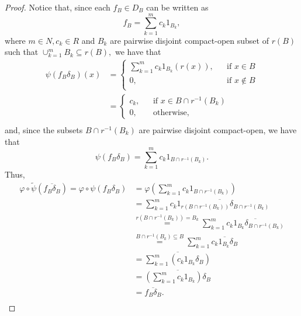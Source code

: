 \documentclass[11pt, a4paper]{amsart}
\theoremstyle{plain}
\begin{document}
\begin{proof}
Notice that, since each $f_B  \in D_B$ can be written as
  $$f_B= \sum_{k=1}^m c_k 1_{B_k},$$
where $m \in N, c_k \in R$ and $B_k$ are pairwise disjoint compact-open subset of $r(B)$ such that $\cup_{k=1}^m B_k \subseteq r(B),$ we have that
\begin{align*}
\psi(f_B \delta_B)(x) & = \left\lbrace \begin{array}{lcl}
                          \sum_{k=1}^m c_k 1_{B_k}(r(x)),  & & \mbox{if} \,\, x \in B \\
                          0,                               & & \mbox{if} \,\, x \notin B \\
                          \end{array}\right. \\
                      & = \left\lbrace \begin{array}{lcl}
                          c_k,  & & \mbox{if} \,\, x \in B \cap r^{-1}(B_k) \\
                          0,     & & \mbox{otherwise,}
                          \end{array}\right. \\
\end{align*} 
and, since the subsets $B \cap r^{-1}(B_k)$ are pairwise disjoint compact-open, we have that 
  $$ \psi(f_B \delta_B)= \sum_{k=1}^m c_k 1_{B \cap r^{-1}(B_k)}. $$ 
Thus,
\begin{align*}
\varphi\circ\tilde{\psi}(\overline{f_B \delta_B}) = \varphi \circ \psi (f_B \delta_B)  
                                        & = \varphi\left(\sum_{k=1}^m c_k 1_{B \cap r^{-1}(B_k)} \right) \\
                                        & = \sum_{k=1}^m \overline{ c_k 1_{r(B \cap r^{-1}(B_k))}\delta_{B \cap r^{-1}(B_k)}}\\
                                        & \stackrel{r(B \cap r^{-1}(B_k))=B_k}{=} \sum_{k=1}^m \overline{ c_k 1_{B_k} \delta_{B \cap r^{-1}(B_k)}  }\\
                                        & \stackrel{B \cap r^{-1}(B_k) \subseteq B}{=}\sum_{k=1}^m \overline{ c_k 1_{B_k} \delta_{B}  }\\
                                        & = \overline{\sum_{k=1}^m  (c_k 1_{B_k} \delta_{B})  }\\
                                        & = \overline{(\sum_{k=1}^m c_k 1_{B_k}) \delta_{B} }\\
                                        & = \overline{f_B \delta_{B} }.\\
\end{align*}


\end{proof}
\end{document}
